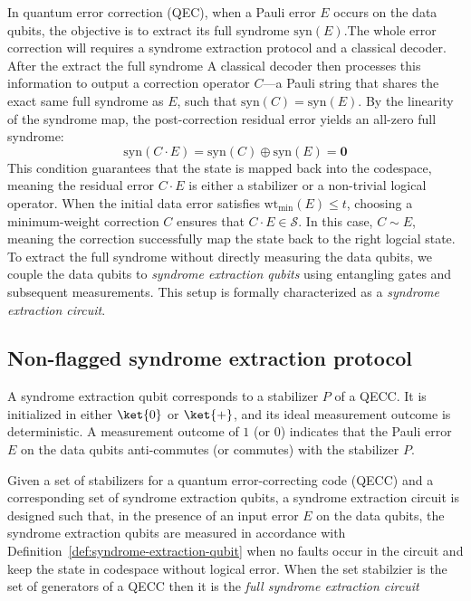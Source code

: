 \documentclass[acmsmallw,review]{acmart}
\begin{document}
In quantum error correction (QEC), when a Pauli error $E$ occurs on the data qubits, the objective is to extract its full syndrome $\text{syn}(E)$.The whole error correction will requires a syndrome extraction protocol and a classical decoder. After the extract the full syndrome A classical decoder then processes this information to output a correction operator $C$—a Pauli string that shares the exact same full syndrome as $E$, such that $\text{syn}(C) = \text{syn}(E)$. By the linearity of the syndrome map, the post-correction residual error yields an all-zero full syndrome:
$$ \text{syn}(C \cdot E) = \text{syn}(C) \oplus \text{syn}(E) = \mathbf{0} $$
This condition guarantees that the state is mapped back into the codespace, meaning the residual error $C \cdot E$ is either a stabilizer or a non-trivial logical operator. When the initial data error satisfies $\mathrm{wt}_{\min}(E) \leq t$, choosing a minimum-weight correction $C$ ensures that $C \cdot E \in \mathcal{S}$. In this case, $C \sim E$, meaning the correction successfully map the state back to the right logcial state. To extract the full syndrome without directly measuring the data qubits, we couple the data qubits to \textit{syndrome extraction qubits} using entangling gates and subsequent measurements. This setup is formally characterized as a \textit{syndrome extraction circuit}.


\subsection{Non-flagged syndrome extraction protocol}

\begin{definition}
\label{def:syndrome-extraction-qubit}
    A syndrome extraction qubit corresponds to a stabilizer $P$ of a QECC. It is initialized in either $\ket{0}$ or $\ket{+}$, and its ideal measurement outcome is deterministic. A measurement outcome of $1$ (or $0$) indicates that the Pauli error $E$ on the data qubits anti-commutes (or commutes) with the stabilizer $P$.
\end{definition}

\begin{definition}
\label{def:syndrome-extraction-circuit}
    Given a set of stabilizers for a quantum error-correcting code (QECC) and a corresponding set of syndrome extraction qubits, a syndrome extraction circuit is designed such that, in the presence of an input error $E$ on the data qubits, the syndrome extraction qubits are measured in accordance with Definition~\ref{def:syndrome-extraction-qubit} when no faults occur in  the circuit and keep the state in codespace without logical error. When the set stabilzier is the set of generators of a QECC then it is the \textit{full syndrome extraction circuit}
\end{definition}
\end{document}
